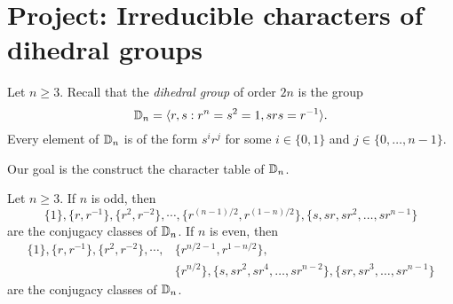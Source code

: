 \section{Project: Irreducible characters of dihedral groups}

Let $n\geq3$. 
Recall that the \emph{dihedral group} of order $2n$ 
is the group
\[
\mathbb{D}_{n}=\langle r,s:r^n=s^2=1,srs=r^{-1}\rangle. 
\]
Every element of $\mathbb{D}_{n}$ is of the form
$s^ir^j$ for some $i\in\{0,1\}$ and $j\in\{0,\dots,n-1\}$. 

Our goal is the construct the character table of $\mathbb{D}_{n}$. 

\begin{proposition}
\label{pro:classes_dihedral}
    Let $n\geq3$. If $n$ is odd, then 
    \[
    \{1\},
    \{r,r^{-1}\},
    \{r^2,r^{-2}\},
    \cdots,\{r^{(n-1)/2},r^{(1-n)/2}\},
    \{s,sr,sr^2,\dots,sr^{n-1}\}
    \]
    are the conjugacy classes of $\mathbb{D}_n$. If $n$ is even, then
    \begin{align*}
        \{1\},
    \{r,r^{-1}\},
    \{r^2,r^{-2}\},
    \cdots,&\{r^{n/2-1},r^{1-n/2}\},\\
    &\{r^{n/2}\},
    \{s,sr^2,sr^4,\dots,sr^{n-2}\},
    \{sr,sr^3,\dots,sr^{n-1}\}
    \end{align*}
    are the conjugacy classes of $\mathbb{D}_n$.
\end{proposition}

